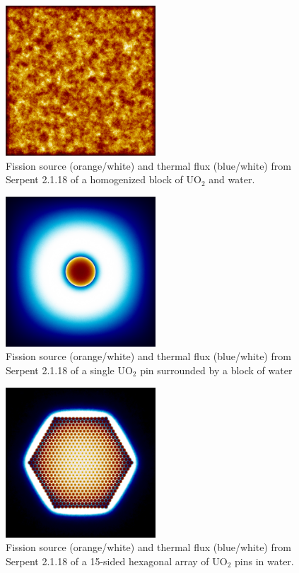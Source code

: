 \begin{figure}[h!] 
  \centering
    \includegraphics[width=0.5\textwidth]{graphics/finalresults/serpent-benchmark-6/homfuel_mesh1.png}
     \caption{Fission source (orange/white) and thermal flux (blue/white) from Serpent 2.1.18 of a homogenized block of UO$_2$ and water. \label{serp_homfuel_mesh} }
\end{figure}

\begin{figure}[h!] 
  \centering
    \includegraphics[width=0.5\textwidth]{graphics/finalresults/serpent-benchmark-6/pincell_mesh1.png}
     \caption{Fission source (orange/white) and thermal flux (blue/white) from Serpent 2.1.18 of a single UO$_2$ pin surrounded by a block of water  \label{serp_pincell_mesh} }
\end{figure}

\begin{figure}[h!] 
  \centering
    \includegraphics[width=0.5\textwidth]{graphics/finalresults/serpent-benchmark-6/assembly_mesh1.png}
     \caption{Fission source (orange/white) and thermal flux (blue/white) from Serpent 2.1.18 of a 15-sided hexagonal array of UO$_2$ pins in water. \label{serp_assembly_mesh} }
\end{figure}
